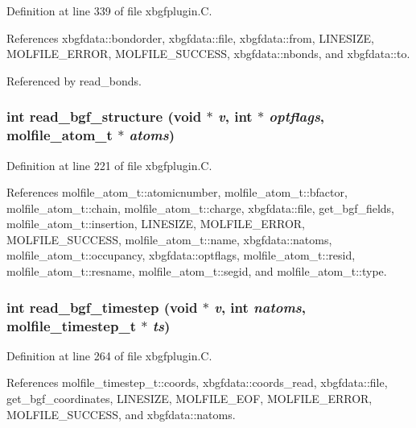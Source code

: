 Definition at line 339 of file xbgfplugin.C.

References xbgfdata::bondorder, xbgfdata::file, xbgfdata::from, LINESIZE, MOLFILE\_\-ERROR, MOLFILE\_\-SUCCESS, xbgfdata::nbonds, and xbgfdata::to.

Referenced by read\_\-bonds.
\subsubsection{\setlength{\rightskip}{0pt plus 5cm}int read\_\-bgf\_\-structure (void $\ast$ {\em v}, int $\ast$ {\em optflags}, {\bf molfile\_\-atom\_\-t} $\ast$ {\em atoms})\hspace{0.3cm}{\tt  [static]}}\label{xbgfplugin_8C_a6}




Definition at line 221 of file xbgfplugin.C.

References molfile\_\-atom\_\-t::atomicnumber, molfile\_\-atom\_\-t::bfactor, molfile\_\-atom\_\-t::chain, molfile\_\-atom\_\-t::charge, xbgfdata::file, get\_\-bgf\_\-fields, molfile\_\-atom\_\-t::insertion, LINESIZE, MOLFILE\_\-ERROR, MOLFILE\_\-SUCCESS, molfile\_\-atom\_\-t::name, xbgfdata::natoms, molfile\_\-atom\_\-t::occupancy, xbgfdata::optflags, molfile\_\-atom\_\-t::resid, molfile\_\-atom\_\-t::resname, molfile\_\-atom\_\-t::segid, and molfile\_\-atom\_\-t::type.
\subsubsection{\setlength{\rightskip}{0pt plus 5cm}int read\_\-bgf\_\-timestep (void $\ast$ {\em v}, int {\em natoms}, {\bf molfile\_\-timestep\_\-t} $\ast$ {\em ts})\hspace{0.3cm}{\tt  [static]}}\label{xbgfplugin_8C_a7}




Definition at line 264 of file xbgfplugin.C.

References molfile\_\-timestep\_\-t::coords, xbgfdata::coords\_\-read, xbgfdata::file, get\_\-bgf\_\-coordinates, LINESIZE, MOLFILE\_\-EOF, MOLFILE\_\-ERROR, MOLFILE\_\-SUCCESS, and xbgfdata::natoms.

